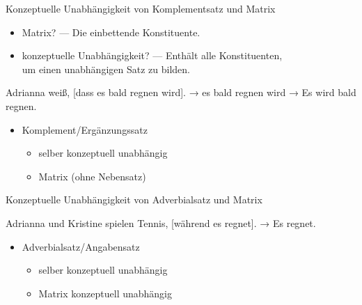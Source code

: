 \begin{frame}
  {Konzeptuelle Unabhängigkeit von Komplementsatz und Matrix}
  \pause
  \begin{itemize}[<+->]
    \item \alert{Matrix}? --- Die \alert{einbettende} Konstituente.
    \item \alert{konzeptuelle Unabhängigkeit}? --- Enthält alle Konstituenten,\\
      um einen unabhängigen Satz zu bilden.
  \end{itemize}
  \pause\Halbzeile
  \begin{exe}
    \ex
    \begin{xlist}
      \ex Adrianna weiß, [dass \alert{es bald regnen wird}].
      \pause
      \ex → \alert{es bald regnen wird}
      \pause
      \ex → \alert{Es wird bald regnen.}
    \end{xlist}
    \pause
  \end{exe}
  \pause\Halbzeile
  \begin{itemize}[<+->]
    \item Komplement\slash Ergänzungssatz
      \begin{itemize}[<+->]
        \item selber \alert{konzeptuell unabhängig}
        \item Matrix  (ohne Nebensatz)
      \end{itemize}
  \end{itemize}
\end{frame}

\begin{frame}
  {Konzeptuelle Unabhängigkeit von Adverbialsatz und Matrix}
  \pause
  \begin{exe}
    \ex
    \begin{xlist}
      \ex Adrianna und Kristine spielen Tennis, [während \alert{es regnet}].
      \pause
      \ex → \alert{Es regnet.}
    \end{xlist}
    \pause
    \ex {}
  \end{exe}
  \pause\Halbzeile
  \begin{itemize}[<+->]
    \item Adverbialsatz\slash Angabensatz
      \begin{itemize}[<+->]
        \item selber \alert{konzeptuell unabhängig}
        \item Matrix \alert{konzeptuell unabhängig}
      \end{itemize}
  \end{itemize}
\end{frame}


